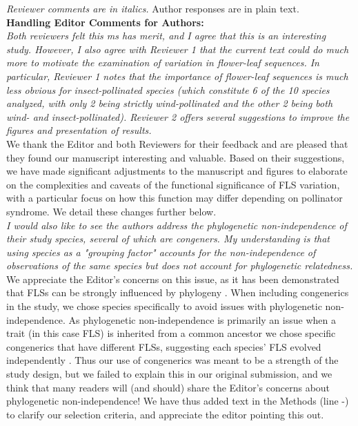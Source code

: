 \documentclass[11pt]{article}
\begin{document}
\emph{Reviewer comments are in italics.} Author responses are in plain text.\\

\textbf{Handling Editor Comments for Authors:}\\

\emph{Both reviewers felt this ms has merit, and I agree that this is an interesting study. However, I also agree with Reviewer 1 that the current text could do much more to motivate the examination of variation in flower-leaf sequences. In particular, Reviewer 1 notes that the importance of flower-leaf sequences is much less obvious for insect-pollinated species (which constitute 6 of the 10 species analyzed, with only 2 being strictly wind-pollinated and the other 2 being both wind- and insect-pollinated). Reviewer 2 offers several suggestions to improve the figures and presentation of results.}\\

\noindent We thank the Editor and both Reviewers for their feedback and are pleased that they found our manuscript interesting and valuable. Based on their suggestions, we have made significant adjustments to the manuscript and figures to elaborate on the complexities and caveats of the functional significance of FLS variation, with a particular focus on how this function may differ depending on pollinator syndrome. We detail these changes further below.\\

\emph{I would also like to see the authors address the phylogenetic non-independence of their study species, several of which are congeners. My understanding is that using species as a "grouping factor" accounts for the non-independence of observations of the same species but does not account for phylogenetic relatedness.}\\

\noindent We appreciate the Editor's concerns on this issue, as it has been demonstrated that FLSs can be strongly influenced by phylogeny \citep{Buonaiuto2020,Gougherty2018}. When including congenerics in the study, we chose species specifically to avoid issues with phylogenetic non-independence. As phylogenetic non-independence is primarily an issue when a trait (in this case FLS) is inherited from a common ancestor we chose specific congenerics that have different FLSs, suggesting each species' FLS evolved independently \citep{Revell:2010aa}. Thus our use of congenerics was meant to be a strength of the study design, but we failed to explain this in our original submission, and we think that many readers will (and should) share the Editor's concerns about phylogenetic non-independence! We have thus added text in the Methods (line -) to clarify our selection criteria, and appreciate the editor pointing this out.\\ 
\end{document}
